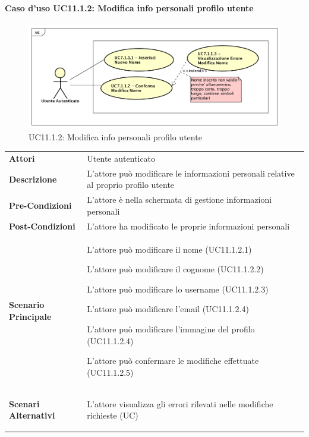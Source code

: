 \paragraph{Caso d'uso UC11.1.2: Modifica info personali profilo utente}
\label{UC11_1_2}
\begin{figure}[ht]
	\centering
	\includegraphics[scale=0.45]{UML/UC7_1_1.png}
	\caption{UC11.1.2: Modifica info personali profilo utente}
\end{figure}
\FloatBarrier
\begin{tabular}{ l | p{11cm}}
	\hline
	\rowcolor{Gray}
	\multicolumn{2}{c}{UC11.1.2 - Modifica info personali profilo utente} \\
	\hline
	\textbf{Attori} & Utente autenticato \\
	\textbf{Descrizione} & L'attore può modificare le informazioni personali relative al proprio profilo utente\\
	\textbf{Pre-Condizioni} & L'attore è nella schermata di gestione informazioni personali\\
	\textbf{Post-Condizioni} & L'attore ha modificato le proprie informazioni personali \\
	\textbf{Scenario Principale} & 
	\begin{enumerate*}[label=(\arabic*.),itemjoin={\newline}]
		\item L'attore può modificare il nome (UC11.1.2.1)
		\item L'attore può modificare il cognome (UC11.1.2.2)
		\item L'attore può modificare lo username (UC11.1.2.3)
		\item L'attore può modificare l'email (UC11.1.2.4)
		\item L'attore può modificare l'immagine del profilo (UC11.1.2.4)
		\item L'attore può confermare le modifiche effettuate (UC11.1.2.5)
	\end{enumerate*}\\
	\textbf{Scenari Alternativi} & 
	\begin{enumerate*}[label=(\arabic*.),itemjoin={\newline}]
		\item L'attore visualizza gli errori rilevati nelle modifiche richieste (UC)
	\end{enumerate*}\\
\end{tabular}

